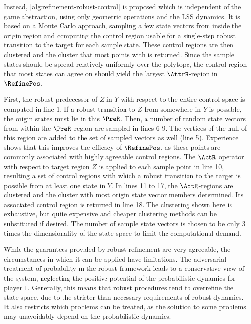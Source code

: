    Instead, [alg:refinement-robust-control] is proposed which is independent of the game abstraction, using only geometric operations and the LSS dynamics.
    It is based on a Monte Carlo approach, sampling a few state vectors from inside the origin region and computing the control region usable for a single-step robust transition to the target for each sample state.
    These control regions are then clustered and the cluster that most points  with is returned.
    Since the sample states should be spread relatively uniformly over the polytope, the control region that most states can agree on should yield the largest $\AttrR$-region in $\RefinePos$.

    First, the robust predecessor of $Z$ in $Y$ with respect to the entire control space is computed in line 1.
    If a robust transition to $Z$ from somewhere in $Y$ is possible, the origin states must lie in this $\PreR$.
    Then, a number of random state vectors from within the $\PreR$-region are sampled in lines 6-9.
    The vertices of the hull of this region are added to the set of sampled vectors as well (line 5).
    Experience shows that this improves the efficacy of $\RefinePos$, as these points are commonly associated with highly agreeable control regions.
    The $\ActR$ operator with respect to target region $Z$ is applied to each sample point in line 10, resulting a set of control regions with which a robust transition to the target is possible from at least one state in $Y$.
    In lines 11 to 17, the $\ActR$-regions are clustered and the cluster with most origin state vector members determined.
    Its associated control region is returned in line 18.
    The clustering shown here is exhaustive, but quite expensive and cheaper clustering methods can be substituted if desired.
    The number of sample state vectors is chosen to be only 3 times the dimensionality of the state space to limit the computational demand.

\stopsubsection


\startsubsection[title={Limitations of Robust Refinement},reference=sec:refinement-robust-limitations]

    While the guarantees provided by robust refinement are very agreeable, the circumstances in which it can be applied have limitations.
    The adversarial treatment of probability in the robust framework leads to a conservative view of the system, neglecting the positive potential of the probabilistic dynamics for player 1.
    Generally, this means that robust procedures tend to overrefine the state space, due to the stricter-than-necessary requirements of robust dynamics.
    It also restricts which problems can be treated, as the solution to some problems may unavoidably depend on the probabilistic dynamics.


